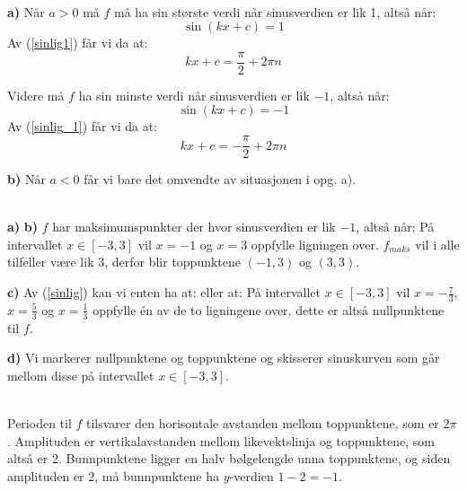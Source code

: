 \\
\textbf{a)} Når $ a>0 $ må $ f $ må ha sin største verdi når sinusverdien er lik 1, altså når:
\[ \sin(kx + c) = 1 \]
Av (\ref{sinlig1}) får vi da at:
\[ kx +c = \frac{\pi}{2}+ 2\pi n \]

Videre må $ f $ ha sin minste verdi når sinusverdien er lik $ -1 $, altså når:
\[ \sin(kx + c) = -1 \]
Av (\ref{sinlig_1}) får vi da at:
\[ kx +c = -\frac{\pi}{2}+2\pi n \]

\textbf{b)} Når $ a<0 $ får vi bare det omvendte av situasjonen i opg. a).\vsk 

\\
\textbf{a)} 
\textbf{b)} $ f $ har maksimumspunkter der hvor sinusverdien er lik $ -1 $, altså når:
På intervallet $ x\in[-3, 3] $ vil $ x=-1 $ og $ x=3 $ oppfylle ligningen over. $ f_{maks} $ vil i alle tilfeller være lik 3, derfor blir toppunktene $ (-1, 3) $ og $ (3, 3) $.\vsk

\textbf{c)} 
Av (\ref{sinlig}) kan vi enten ha at:
eller at:
På intervallet $ x\in[-3, 3] $ vil $ x=-\frac{7}{3} $, $ x=\frac{5}{3} $ og $ x=\frac{1}{3} $ oppfylle én av de to ligningene over, dette er altså nullpunktene til $ f $.

\textbf{d)} Vi markerer nullpunktene og toppunktene og skisserer sinuskurven som går mellom disse på intervallet $ x\in[-3, 3] $.\vsk

\\
Perioden til $ f $ tilsvarer den horisontale avstanden mellom toppunktene, som er $ 2\pi $. Amplituden er vertikalavstanden mellom likevektslinja og toppunktene, som altså er 2. Bunnpunktene ligger en halv bølgelengde unna toppunktene, og siden amplituden er 2, må bunnpunktene ha $ y $-verdien $ 1-2=-1 $.\vs
{}

